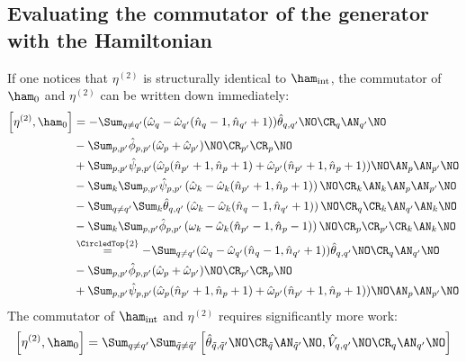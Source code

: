 \begin{appendix}
\subsection{Evaluating the commutator of the generator with the Hamiltonian}
If one notices that $\eta^{(2)}$ is structurally identical to $\ham_{\mathrm{int}}$, the commutator of $\ham_0$ and $\eta^{(2)}$ can be written down immediately:
\begin{align}
\left[\eta^{(2)},\ham_0\right] &= -\Sum_{q\neq q^\prime}(\hat\omega_q-\hat\omega_{q^\prime}(\hat n_q-1,\hat n_{q^\prime}+1))\hat \theta_{q,q^\prime}\NO\CR_q\AN_{q^\prime}\NO \nonumber \\\quad&
- \Sum_{p,p^\prime}\hat\phi_{p,p^\prime}(\hat\omega_p+\hat\omega_{p^\prime}) \NO\CR_{p^\prime}\CR_p\NO\nonumber\\ \quad& 
+\Sum_{p,p^\prime} \hat\psi_{p,p^\prime} (\hat\omega_p(\hat n_{p^\prime}+1,\hat n_p +1)+\hat\omega_{p^\prime}(\hat n_{p^\prime}+1,\hat n_p +1))\NO\AN_p\AN_{p^\prime}\NO\nonumber \\ \quad&
- \Sum_k\Sum_{p,p^\prime}\hat  \psi_{p,p^\prime} \left(\hat\omega_k-\hat\omega_k(\hat n_{p^\prime}+1,\hat n_p +1)\right)\NO \CR_k\AN_k\AN_p\AN_{p^\prime}\NO\nonumber \\ \quad&
-\Sum_{q\neq q^\prime}\Sum_k \hat \theta_{q,q^\prime} \left(\hat\omega_k - \hat\omega_k(\hat n_q-1,\hat n_{q^\prime}+1)\right)\NO \CR_q\CR_k\AN_{q^\prime}\AN_k\NO \nonumber \\\quad&
- \Sum_k\Sum_{p,p^\prime}\hat\phi_{p,p^\prime} \left(\omega_k-\hat\omega_k(\hat n_{p^\prime}-1,\hat n_p -1)\right)\NO \CR_p\CR_{p^\prime}\CR_k\AN_k\NO \nonumber \\\quad&
\overset{\CircledTop{2}}{=} -\Sum_{q\neq q^\prime}(\hat\omega_q-\hat\omega_{q^\prime}(\hat n_q-1,\hat n_{q^\prime}+1))\hat \theta_{q,q^\prime}\NO\CR_q\AN_{q^\prime}\NO \nonumber \\\quad&
- \Sum_{p,p^\prime}\hat\phi_{p,p^\prime}(\hat\omega_p+\hat\omega_{p^\prime}) \NO\CR_{p^\prime}\CR_p\NO\nonumber\\ \quad& 
+\Sum_{p,p^\prime} \hat\psi_{p,p^\prime} (\hat\omega_p(\hat n_{p^\prime}+1,\hat n_p +1)+\hat\omega_{p^\prime}(\hat n_{p^\prime}+1,\hat n_p +1))\NO\AN_p\AN_{p^\prime}\NO
\end{align}
The commutator of $\ham_{\mathrm{int}}$ and $\eta^{(2)}$ requires significantly more work:
\begin{subequations}
\begin{align}
\left[\eta^{(2)},\ham_0\right] &= \Sum_{q\neq q^\prime}\Sum_{\tilde q\neq\tilde q^\prime} \left[\hat\theta_{\tilde q,\tilde q^\prime}\NO\CR_{\tilde q}\AN_{\tilde q^\prime}\NO,\hat V_{q,q^\prime}\NO\CR_q\AN_{q^\prime}\NO\right] \label{com_eta_Hint_A} \\

\end{align}
\end{subequations}
\end{appendix}
